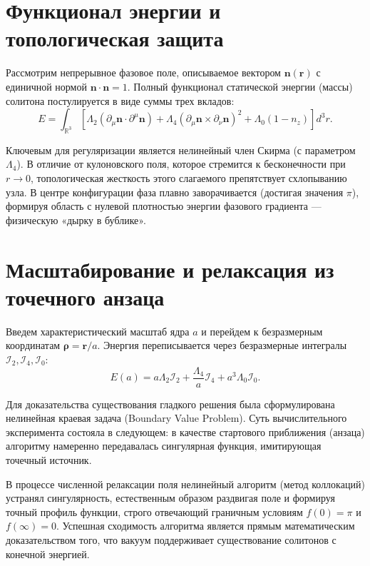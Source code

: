 \documentclass[12pt,a4paper]{article}
\begin{document}
\section{Функционал энергии и топологическая защита}
Рассмотрим непрерывное фазовое поле, описываемое вектором $\mathbf{n}(\mathbf{r})$ с единичной нормой $\mathbf{n} \cdot \mathbf{n} = 1$. Полный функционал статической энергии (массы) солитона постулируется в виде суммы трех вкладов:
\begin{equation}
E = \int_{\mathbb{R}^3} \left[ \Lambda_2 (\partial_\mu \mathbf{n} \cdot \partial^\mu \mathbf{n}) + \Lambda_4 (\partial_\mu \mathbf{n} \times \partial_\nu \mathbf{n})^2 + \Lambda_0 (1 - n_z) \right] d^3r.
\label{eq:energy_functional}
\end{equation}

Ключевым для регуляризации является нелинейный член Скирма (с параметром $\Lambda_4$). В отличие от кулоновского поля, которое стремится к бесконечности при $r \to 0$, топологическая жесткость этого слагаемого препятствует схлопыванию узла. В центре конфигурации фаза плавно заворачивается (достигая значения $\pi$), формируя область с нулевой плотностью энергии фазового градиента — физическую «дырку в бублике».

\section{Масштабирование и релаксация из точечного анзаца}
Введем характеристический масштаб ядра $a$ и перейдем к безразмерным координатам $\boldsymbol{\rho} = \mathbf{r}/a$. Энергия переписывается через безразмерные интегралы $\mathcal{I}_2, \mathcal{I}_4, \mathcal{I}_0$:
\begin{equation}
E(a) = a \Lambda_2 \mathcal{I}_2 + \frac{\Lambda_4}{a} \mathcal{I}_4 + a^3 \Lambda_0 \mathcal{I}_0.
\label{eq:energy_scaled}
\end{equation}

Для доказательства существования гладкого решения была сформулирована нелинейная краевая задача (Boundary Value Problem). Суть вычислительного эксперимента состояла в следующем: в качестве стартового приближения (анзаца) алгоритму намеренно передавалась сингулярная функция, имитирующая точечный источник. 

В процессе численной релаксации поля нелинейный алгоритм (метод коллокаций) устранял сингулярность, естественным образом раздвигая поле и формируя точный профиль функции, строго отвечающий граничным условиям $f(0) = \pi$ и $f(\infty) = 0$. Успешная сходимость алгоритма является прямым математическим доказательством того, что вакуум поддерживает существование солитонов с конечной энергией.
\end{document}
